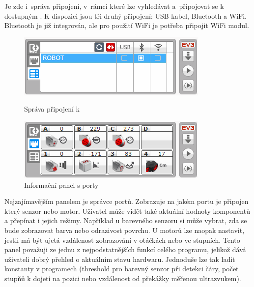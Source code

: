 Je zde i~správa připojení, v~rámci které lze vyhledávat a~připojovat se k dostupným . 
K dispozici jsou tři druhý připojení: USB kabel, Bluetooth a WiFi. Bluetooth je již integrován, ale pro použití WiFi je potřeba připojit WiFi modul.

\begin{figure}[h]
	\begin{minipage}[b]{.48\textwidth}
		\centering
		\includegraphics[width=\textwidth]{images/lego-soft/lego-soft_brick-manager_connected.png}
		\caption{Správa připojení k }
		\label{fig:lego-soft_brick-manager-connected}
	\end{minipage}
	\hfill
	\begin{minipage}[b]{.48\textwidth}
		\centering
		\includegraphics[width=\textwidth]{images/lego-soft/lego-soft_brick_port-view.png}
		\caption{Informační panel s porty}
		\label{fig:lego-soft_brick_port-view}
	\end{minipage}
\end{figure}
Nejzajímavějším panelem je správce portů. 
Zobrazuje na jakém portu je připojen který senzor nebo motor. 
Uživatel může vidět také aktuální hodnoty komponentů a přepínat i jejich režimy.    
Například u barevného senzoru si může vybrat, zda se bude zobrazovat barva nebo odrazivost povrchu. U motorů lze naopak nastavit, jestli má být ujetá vzdálenost zobrazování v otáčkách nebo ve stupních. 
Tento panel považuji ze jednu z nejpodstatnějších funkcí celého programu, jelikož dává uživateli dobrý přehled o aktuálním stavu hardwaru. 
Jednoduše lze tak ladit konstanty v programech (threshold pro barevný senzor při detekci čáry, počet stupňů k dojetí na pozici nebo vzdálenost od překážky měřenou ultrazvukem). 

